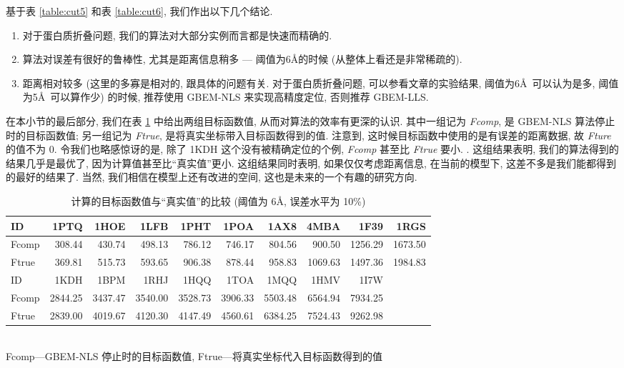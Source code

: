 基于表 \ref{table:cut5} 和表 \ref{table:cut6}, 
我们作出以下几个结论. 
\begin{enumerate}
  \item 对于蛋白质折叠问题, 我们的算法对大部分实例而言都是快速而精确的.
  \item 算法对误差有很好的鲁棒性, 尤其是距离信息稍多 --- 阈值为6\AA 的时候
  (从整体上看还是非常稀疏的).
  \item 距离相对较多 (这里的多寡是相对的, 跟具体的问题有关. 对于蛋白质折叠问题, 可以参看文章的实验结果, 阈值为6\AA ~可以认为是多, 阈值为5\AA ~可以算作少) 的时候, 推荐使用 GBEM-NLS 来实现高精度定位, 否则推荐 GBEM-LLS.
\end{enumerate}

在本小节的最后部分, 我们在表 \ref{table:fval} 中给出两组目标函数值,
从而对算法的效率有更深的认识.
其中一组记为 \emph{Fcomp}, 是 GBEM-NLS 算法停止时的目标函数值;
另一组记为 \emph{Ftrue}, 是将真实坐标带入目标函数得到的值.
注意到, 这时候目标函数中使用的是有误差的距离数据,
故 \emph{Fture} 的值不为 0.
令我们也略感惊讶的是, 除了 1KDH 这个没有被精确定位的个例, 
\emph{Fcomp} 甚至比 \emph{Ftrue} 要小.
.
这组结果表明, 我们的算法得到的结果几乎是最优了,
因为计算值甚至比``真实值''更小.
这组结果同时表明, 如果仅仅考虑距离信息, 在当前的模型下,
这差不多是我们能都得到的最好的结果了.
当然, 我们相信在模型上还有改进的空间, 这也是未来的一个有趣的研究方向.

\setlength{\tabcolsep}{5.5pt}
\begin{table}[!htbp]
  \centering
  \footnotesize{
    \caption{计算的目标函数值与``真实值''的比较 (阈值为 6\AA, 误差水平为 10\%)}
    \begin{tabular}{lrrrrrrrrr}
      \toprule
      ID    & 1PTQ & 1HOE & 1LFB & 1PHT & 1POA & 1AX8 & 4MBA & 1F39 & 1RGS \\
      \midrule
      Fcomp & 308.44 & 430.74 & 498.13 & 786.12 & 746.17 & 804.56 &  900.50	& 1256.29 & 1673.50 \\	
      Ftrue & 369.81 & 515.73 & 593.65 & 906.38	& 878.44 & 958.83 & 1069.63	& 1497.36 & 1984.83	\\
      \midrule
      \midrule
      ID & 1KDH & 1BPM & 1RHJ & 1HQQ & 1TOA & 1MQQ & 1HMV & 1I7W & \\
      \midrule
      Fcomp & 2844.25 &3437.47&	3540.00&	3528.73 & 3906.33 & 5503.48	& 6564.94 & 7934.25 & \\
      Ftrue & 2839.00 &4019.67&	4120.30&	4147.49 & 4560.61 &	6384.25 & 7524.43 &	9262.98 & \\
      \toprule
    \end{tabular}\\[-4mm]
    \label{table:fval}
    \bl *Fcomp---GBEM-NLS 停止时的目标函数值, Ftrue---将真实坐标代入目标函数得到的值
    \el
  }
\end{table}




